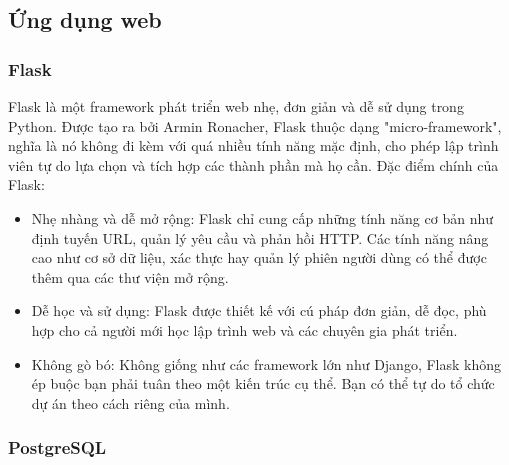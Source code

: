 \subsection{Ứng dụng web}
\subsubsection{Flask}

Flask là một framework phát triển web nhẹ, đơn giản và dễ sử dụng trong Python.
Được tạo ra bởi Armin Ronacher, Flask thuộc dạng "micro-framework", nghĩa là nó
không đi kèm với quá nhiều tính năng mặc định, cho phép lập trình viên tự do lựa
chọn và tích hợp các thành phần mà họ cần. Đặc điểm chính của Flask:
\begin{itemize}
    \item Nhẹ nhàng và dễ mở rộng: Flask chỉ cung cấp những tính năng cơ bản như
        định tuyến URL, quản lý yêu cầu và phản hồi HTTP. Các tính năng nâng cao như cơ sở dữ liệu, xác thực hay quản lý phiên người dùng có thể được thêm qua các thư viện mở rộng.
    \item Dễ học và sử dụng: Flask được thiết kế với cú pháp đơn giản, dễ đọc,
        phù hợp cho cả người mới học lập trình web và các chuyên gia phát triển.
    \item Không gò bó: Không giống như các framework lớn như Django, Flask không
        ép buộc bạn phải tuân theo một kiến trúc cụ thể. Bạn có thể tự do tổ chức dự án theo cách riêng của mình.
\end{itemize}

\subsubsection{PostgreSQL}

